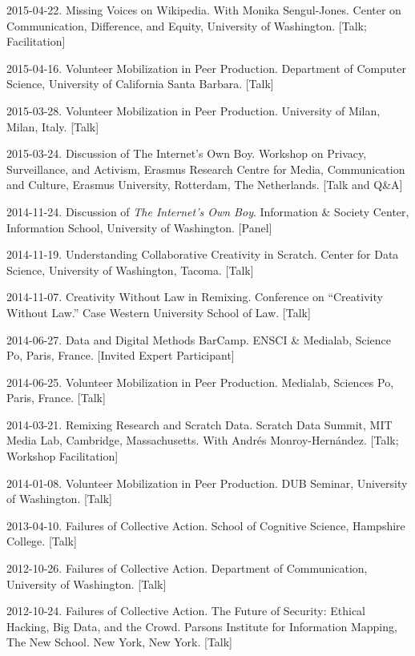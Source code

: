 \documentclass[10pt]{article}
\newenvironment{cvlist}{
\begin{list}{}{\leftmargin=3.0em \itemindent=-3.0em}
  \setlength{\itemsep}{0pt}
  \setlength{\parskip}{0em}
  \setlength{\parsep}{1em}
  \setlength{\parindent}{0em}}
{\vspace{1em}
\end{list}}
\begin{document}
\begin{cvlist}
\item 2015-04-22. Missing Voices on Wikipedia. With Monika Sengul-Jones. Center on Communication, Difference, and Equity, University of Washington. [Talk; Facilitation]
\item 2015-04-16. Volunteer Mobilization in Peer Production. Department of Computer Science, University of California Santa Barbara. [Talk]
\item 2015-03-28. Volunteer Mobilization in Peer Production. University of Milan, Milan, Italy. [Talk]
\item 2015-03-24. Discussion of The Internet’s Own Boy. Workshop on Privacy, Surveillance, and Activism, Erasmus Research Centre for Media, Communication and Culture, Erasmus University, Rotterdam, The Netherlands. [Talk and Q\&A]
\item 2014-11-24. Discussion of \emph{The Internet's Own Boy}. Information \& Society Center, Information School, University of Washington. [Panel]
\item 2014-11-19. Understanding Collaborative Creativity in Scratch. Center for Data Science, University of Washington, Tacoma. [Talk]
\item 2014-11-07. Creativity Without Law in Remixing. Conference on ``Creativity Without Law.'' Case Western University School of Law. [Talk]
\item 2014-06-27. Data and Digital Methods BarCamp. ENSCI \& Medialab, Science Po, Paris, France. [Invited Expert Participant]
\item 2014-06-25. Volunteer Mobilization in Peer Production. Medialab, Sciences Po, Paris, France. [Talk]
\item 2014-03-21. Remixing Research and Scratch Data. Scratch Data Summit, MIT Media Lab, Cambridge, Massachusetts. With Andrés Monroy-Hernández. [Talk; Workshop Facilitation]
\item 2014-01-08. Volunteer Mobilization in Peer Production. DUB Seminar, University of Washington. [Talk]
\item 2013-04-10. Failures of Collective Action. School of Cognitive Science, Hampshire College. [Talk]
\item 2012-10-26. Failures of Collective Action. Department of Communication, University of Washington. [Talk]
\item 2012-10-24. Failures of Collective Action. The Future of Security: Ethical Hacking, Big Data, and the Crowd. Parsons Institute for Information Mapping, The New School. New York, New York. [Talk]

\end{cvlist}
\end{document}
